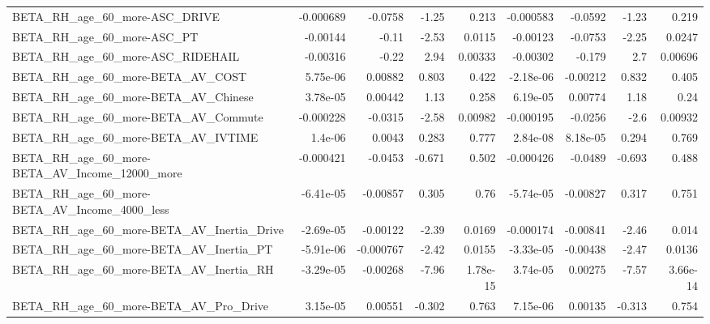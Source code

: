 \begin{tabular}{lrrrrrrrr}
BETA\_RH\_age\_60\_more-ASC\_DRIVE                      &   -0.000689 &      -0.0758 &    -1.25 &    0.213 &  -0.000583 &     -0.0592 &        -1.23 &         0.219 \\
BETA\_RH\_age\_60\_more-ASC\_PT                         &    -0.00144 &        -0.11 &    -2.53 &   0.0115 &   -0.00123 &     -0.0753 &        -2.25 &        0.0247 \\
BETA\_RH\_age\_60\_more-ASC\_RIDEHAIL                   &    -0.00316 &        -0.22 &     2.94 &  0.00333 &   -0.00302 &      -0.179 &          2.7 &       0.00696 \\
BETA\_RH\_age\_60\_more-BETA\_AV\_COST                   &    5.75e-06 &      0.00882 &    0.803 &    0.422 &  -2.18e-06 &    -0.00212 &        0.832 &         0.405 \\
BETA\_RH\_age\_60\_more-BETA\_AV\_Chinese                &    3.78e-05 &      0.00442 &     1.13 &    0.258 &   6.19e-05 &     0.00774 &         1.18 &          0.24 \\
BETA\_RH\_age\_60\_more-BETA\_AV\_Commute                &   -0.000228 &      -0.0315 &    -2.58 &  0.00982 &  -0.000195 &     -0.0256 &         -2.6 &       0.00932 \\
BETA\_RH\_age\_60\_more-BETA\_AV\_IVTIME                 &     1.4e-06 &       0.0043 &    0.283 &    0.777 &   2.84e-08 &    8.18e-05 &        0.294 &         0.769 \\
BETA\_RH\_age\_60\_more-BETA\_AV\_Income\_12000\_more      &   -0.000421 &      -0.0453 &   -0.671 &    0.502 &  -0.000426 &     -0.0489 &       -0.693 &         0.488 \\
BETA\_RH\_age\_60\_more-BETA\_AV\_Income\_4000\_less       &   -6.41e-05 &     -0.00857 &    0.305 &     0.76 &  -5.74e-05 &    -0.00827 &        0.317 &         0.751 \\
BETA\_RH\_age\_60\_more-BETA\_AV\_Inertia\_Drive          &   -2.69e-05 &     -0.00122 &    -2.39 &   0.0169 &  -0.000174 &    -0.00841 &        -2.46 &         0.014 \\
BETA\_RH\_age\_60\_more-BETA\_AV\_Inertia\_PT             &   -5.91e-06 &    -0.000767 &    -2.42 &   0.0155 &  -3.33e-05 &    -0.00438 &        -2.47 &        0.0136 \\
BETA\_RH\_age\_60\_more-BETA\_AV\_Inertia\_RH             &   -3.29e-05 &     -0.00268 &    -7.96 & 1.78e-15 &   3.74e-05 &     0.00275 &        -7.57 &      3.66e-14 \\
BETA\_RH\_age\_60\_more-BETA\_AV\_Pro\_Drive              &    3.15e-05 &      0.00551 &   -0.302 &    0.763 &   7.15e-06 &     0.00135 &       -0.313 &         0.754 \\

\end{tabular}
